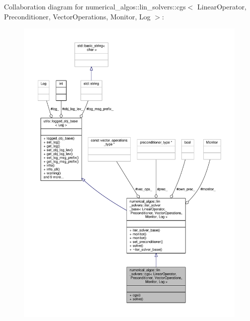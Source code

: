 Collaboration diagram for numerical\-\_\-algos\-:\-:lin\-\_\-solvers\-:\-:cgs$<$ Linear\-Operator, Preconditioner, Vector\-Operations, Monitor, Log $>$\-:\nopagebreak
\begin{figure}[H]
\begin{center}
\leavevmode
\includegraphics[width=350pt]{classnumerical__algos_1_1lin__solvers_1_1cgs__coll__graph}
\end{center}
\end{figure}
